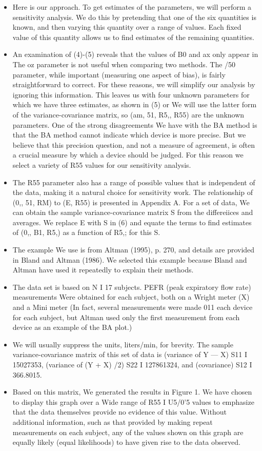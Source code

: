 \documentclass[]{article}
\begin{document}
\begin{itemize}
	\item Here is our approach. To get estimates of the parameters, we will perform a
sensitivity analysis. We do this by pretending that one of the six quantities is known, and then varying this quantity over a range of values. Each ﬁxed value of this quantity
allows us to ﬁnd estimates of the remaining quantities.
 \item An examination of (4)-(5) reveals that the values of B0 and ax only appear in 
The oz parameter is not useful when comparing two methods. The /50 parameter,
while important (measuring one aspect of bias), is fairly straightforward to correct. For these reasons, we will simplify our analysis by ignoring this information. This
leaves us with four unknown parameters for which we have three estimates, as shown
in (5) or  We will use the latter form of the variance-covariance matrix, so (am, 51, R5,, R55) are the unknown parameters.
One of the strong disagreements We have with the BA method is that the BA
method cannot indicate which device is more precise. But we believe that this precision
question, and not a measure of agreement, is often a crucial measure by which a device
should be judged. For this reason we select a variety of R55 values for our sensitivity
analysis. 
\item The R55 parameter also has a range of possible values that is independent
of the data, making it a natural choice for sensitivity work.
The relationship of (0,, 51, RM) to (E, R55) is presented in Appendix A. For a set
of data, We can obtain the sample variance-covariance matrix S from the differeiices
and averages. We replace E with S in (6) and equate the terms to ﬁnd estimates of
(0,, B1, R5,) as a function of R5,; for this S.
\item The example We use is from Altman (1995), p. 270, and details are provided in
Bland and Altman (1986). We selected this example because Bland and Altman have
used it repeatedly to explain their methods. 
\item The data set is based on N I 17 subjects.
PEFR (peak expiratory ﬂow rate) measurements Were obtained for each subject, both
on a Wright meter (X) and a Mini meter  (In fact, several measurements were
made 011 each device for each subject, but Altman used only the ﬁrst measurement
from each device as an example of the BA plot.) 
\item We will usually suppress the units,
liters/min, for brevity. The sample variance-covariance matrix of this set of data is
(variance of Y — X) S11 I 15027353, (variance of (Y + X) /2) S22 I 127861324,
and (covariance) S12 I 366.8015.
\item Based on this matrix, We generated the results in Figure 1. We have chosen to
display this graph over a Wide range of R55 I U5/0'5 values to emphasize that the
data themselves provide no evidence of this value. Without additional information,
such as that provided by making repeat measurements on each subject, any of the
values shown on this graph are equally likely (equal likelihoods) to have given rise to
the data observed.
\end{itemize}
\end{document}
